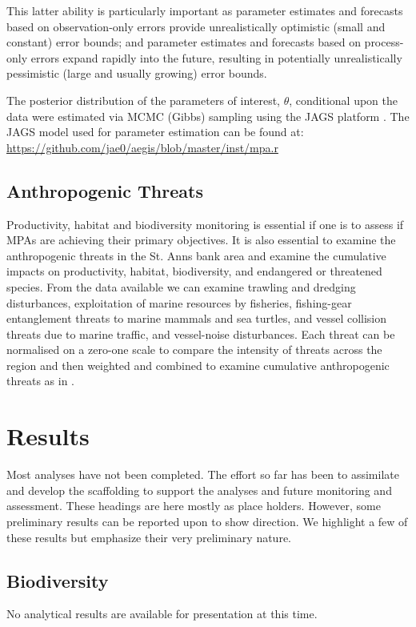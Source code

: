 \documentclass[letterpaper,portrait,11pt]{scrartcl}
\numberwithin{equation}{section}    %
\numberwithin{figure}{section}    %
\numberwithin{table}{section}       %
\begin{document}
This latter ability is particularly important as parameter estimates and forecasts based on observation-only errors provide unrealistically optimistic (small and constant) error bounds; and parameter estimates and forecasts based on process-only errors expand rapidly into the future, resulting in potentially unrealistically pessimistic (large and usually growing) error bounds.

The posterior distribution of the parameters of interest, $\theta$, conditional upon the data were estimated via MCMC (Gibbs) sampling using the JAGS platform \parencite{Plummer03jags}. The JAGS model used for parameter estimation can be found at: \url{https://github.com/jae0/aegis/blob/master/inst/mpa.r}

\subsection{Anthropogenic Threats}
Productivity, habitat and biodiversity monitoring is essential if one is to assess if MPAs are achieving their primary objectives. It is also essential to examine the anthropogenic threats in the St. Anns bank area and examine the cumulative impacts on productivity, habitat, biodiversity, and endangered or threatened species. From the data available we can examine trawling and dredging disturbances, exploitation of marine resources by fisheries, fishing-gear entanglement threats to marine mammals and sea turtles, and vessel collision threats due to marine traffic, and vessel-noise disturbances. Each threat can be normalised on a zero-one scale to compare the intensity of threats across the region and then weighted and combined to examine cumulative anthropogenic threats as in \textcite{coll:2012:mediterranean}.



\section{Results}
\label{sec:results}

Most analyses have not been completed. The effort so far has been to assimilate and develop the scaffolding to support the analyses and future monitoring and assessment. These headings are here mostly as place holders. However, some preliminary results can be reported upon to show direction. We highlight a few of these results but emphasize their very preliminary nature.

\subsection{Biodiversity}
No analytical results are available for presentation at this time.
\end{document}
